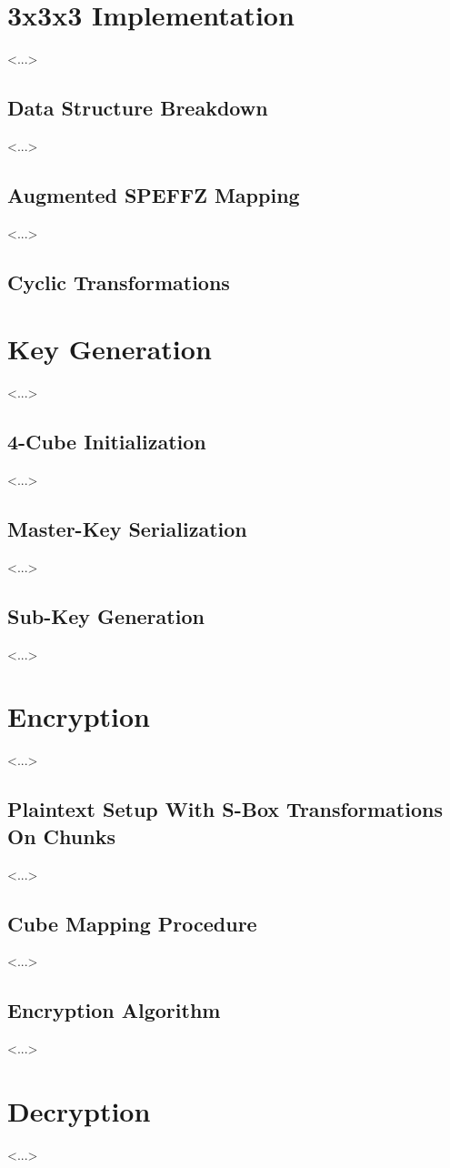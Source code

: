 \documentclass[12pt]{article}
\begin{document}
\section{3x3x3 Implementation}
<...>

\subsection{Data Structure Breakdown}
<...>

\subsection{Augmented SPEFFZ Mapping}
<...>

\subsection{Cyclic Transformations}

\section{Key Generation}
<...>

\subsection{4-Cube Initialization}
<...>

\subsection{Master-Key Serialization}
<...>

\subsection{Sub-Key Generation}
<...>

\section{Encryption}
<...>

\subsection{Plaintext Setup With S-Box Transformations On Chunks}
<...>

\subsection{Cube Mapping Procedure}
<...>

\subsection{Encryption Algorithm}
<...>

\section{Decryption}
<...>
\end{document}
